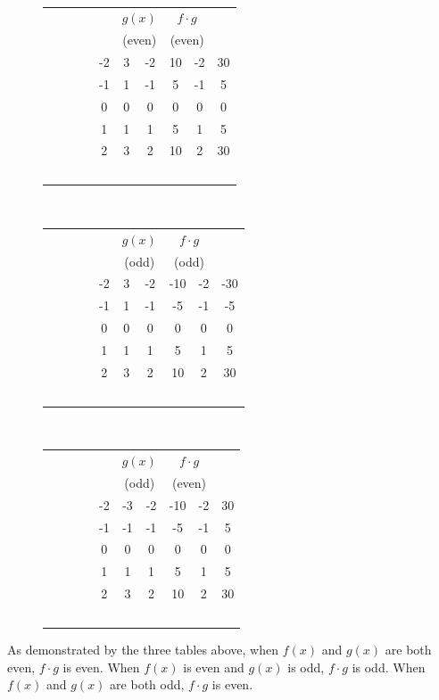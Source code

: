 \documentclass{article}
\begin{document}
\begin{enumerate}
\begin{figure}[!htb]
  \begin{table}[H]
    \begin{tabular}{cc|cc|cc}
    \multicolumn{2}{c}{$f(x)$} & \multicolumn{2}{c}{$g(x)$} & \multicolumn{2}{c}{$f\cdot g$} \\
    \multicolumn{2}{c}{(even)} & \multicolumn{2}{c}{(even)} & \multicolumn{2}{c}{(even)} \\ \hline
        -2 & 3 & -2 & 10 & -2 & 30 \\ 
        -1 & 1 & -1 & 5 & -1 & 5 \\ 
        0 & 0 & 0 & 0 & 0 & 0 \\
        1 & 1 & 1 & 5 & 1 & 5 \\ 
        2 & 3 & 2 & 10 & 2 & 30 \\ 
    \end{tabular}
\end{table}
\endminipage\hfill
{}
  \begin{table}[H]
    \begin{tabular}{cc|cc|cc}
    \multicolumn{2}{c}{$f(x)$} & \multicolumn{2}{c}{$g(x)$} & \multicolumn{2}{c}{$f\cdot g$} \\
    \multicolumn{2}{c}{(even)} & \multicolumn{2}{c}{(odd)} & \multicolumn{2}{c}{(odd)} \\ \hline
        -2 & 3 & -2 & -10 & -2 & -30 \\ 
        -1 & 1 & -1 & -5 & -1 & -5 \\ 
        0 & 0 & 0 & 0 & 0 & 0 \\
        1 & 1 & 1 & 5 & 1 & 5 \\ 
        2 & 3 & 2 & 10 & 2 & 30 \\ 
    \end{tabular}
\end{table}
\endminipage\hfill
{}%
\begin{table}[H]
    \begin{tabular}{cc|cc|cc}
    \multicolumn{2}{c}{$f(x)$} & \multicolumn{2}{c}{$g(x)$} & \multicolumn{2}{c}{$f\cdot g$} \\
    \multicolumn{2}{c}{(odd)} & \multicolumn{2}{c}{(odd)} & \multicolumn{2}{c}{(even)} \\ \hline
        -2 & -3 & -2 & -10 & -2 & 30 \\ 
        -1 & -1 & -1 & -5 & -1 & 5 \\ 
        0 & 0 & 0 & 0 & 0 & 0 \\
        1 & 1 & 1 & 5 & 1 & 5 \\ 
        2 & 3 & 2 & 10 & 2 & 30 \\ 
    \end{tabular}
\end{table}
\endminipage
\end{figure}

As demonstrated by the three tables above, when $f(x)$ and $g(x)$ are both even, $f\cdot g$ is even. When $f(x)$ is even and $g(x)$ is odd, $f\cdot g$ is odd. When $f(x)$ and $g(x)$ are both odd, $f\cdot g$ is even.

\end{enumerate}
\end{document}
